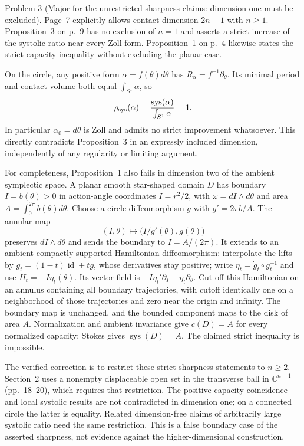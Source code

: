 \documentclass[10pt]{article}
\begin{document}
Problem 3 (Major for the unrestricted sharpness claims: dimension one must be excluded).  Page 7 explicitly allows contact dimension \(2n-1\) with \(n\ge1\). Proposition 3 on p. 9 has no exclusion of \(n=1\) and asserts a strict increase of the systolic ratio near every Zoll form. Proposition 1 on p. 4 likewise states the strict capacity inequality without excluding the planar case.\par
On the circle, any positive form \(\alpha=f(\theta)d\theta\) has \(R_\alpha=f^{-1}\partial_\theta\). Its minimal period and contact volume both equal \(\int_{S^1}\alpha\), so \[\rho_{\rm sys}(\alpha)
 =\frac{\operatorname{sys}(\alpha)}{\int_{S^1}\alpha}=1.\] In particular \(\alpha_0=d\theta\) is Zoll and admits no strict improvement whatsoever. This directly contradicts Proposition 3 in an expressly included dimension, independently of any regularity or limiting argument.\par
For completeness, Proposition 1 also fails in dimension two of the ambient symplectic space. A planar smooth star-shaped domain \(D\) has boundary \(I=b(\theta)>0\) in action-angle coordinates \(I=r^2/2\), with \(\omega=dI\wedge d\theta\) and area \(A=\int_0^{2\pi}b(\theta)d\theta\). Choose a circle diffeomorphism \(g\) with \(g'=2\pi b/A\). The annular map \[(I,\theta)\longmapsto \bigl(I/g'(\theta),g(\theta)\bigr)\] preserves \(dI\wedge d\theta\) and sends the boundary to \(I=A/(2\pi)\). It extends to an ambient compactly supported Hamiltonian diffeomorphism: interpolate the lifts by \(g_t=(1-t)\operatorname{id}+tg\), whose derivatives stay positive; write \(\eta_t=\dot g_t\circ g_t^{-1}\) and use \(H_t=-I\eta_t(\theta)\). Its vector field is \(-I\eta_t'\partial_I+\eta_t\partial_\theta\). Cut off this Hamiltonian on an annulus containing all boundary trajectories, with cutoff identically one on a neighborhood of those trajectories and zero near the origin and infinity. The boundary map is unchanged, and the bounded component maps to the disk of area \(A\). Normalization and ambient invariance give \(c(D)=A\) for every normalized capacity; Stokes gives \(\operatorname{sys}(D)=A\). The claimed strict inequality is impossible.\par
The verified correction is to restrict these strict sharpness statements to \(n\ge2\). Section 2 uses a nonempty displaceable open set in the transverse ball in \(\mathbb C^{n-1}\) (pp. 18–20), which requires that restriction. The positive capacity coincidence and local systolic results are not contradicted in dimension one; on a connected circle the latter is equality. Related dimension-free claims of arbitrarily large systolic ratio need the same restriction. This is a false boundary case of the asserted sharpness, not evidence against the higher-dimensional construction.\par
\end{document}
